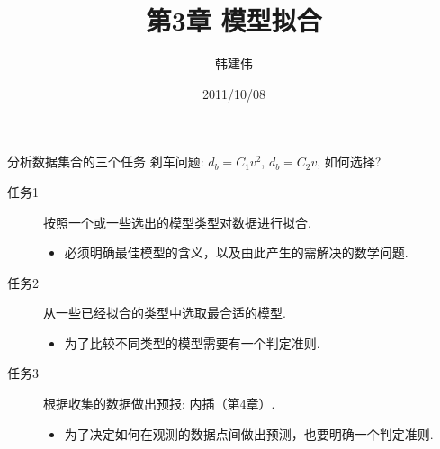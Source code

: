 \documentclass[mathserif]{beamer}
\title{第3章 模型拟合}
\author{韩建伟}
\institute{
  浙江工商大学信息学院\\
  \texttt{hanjianwei@mail.zjgsu.edu.cn}
}
\date{2011/10/08}
\begin{document}
\begin{frame}[plain]
  \titlepage{}
\end{frame}

\begin{frame}{分析数据集合的三个任务}
  刹车问题: $d_b=C_1v^2$, $d_b=C_2v$, 如何选择?

  \begin{description}
  \item[任务1] 按照一个或一些选出的模型类型对数据进行拟合.
    \begin{itemize}
    \item 必须明确最佳模型的含义，以及由此产生的需解决的数学问题.
    \end{itemize}
  \item[任务2] 从一些已经拟合的类型中选取最合适的模型.
    \begin{itemize}
    \item 为了比较不同类型的模型需要有一个判定准则.
    \end{itemize}
  \item[任务3] 根据收集的数据做出预报: 内插（第4章）.
    \begin{itemize}
    \item 为了决定如何在观测的数据点间做出预测，也要明确一个判定准则.
    \end{itemize}
  \end{description}

\end{frame}
\end{document}
